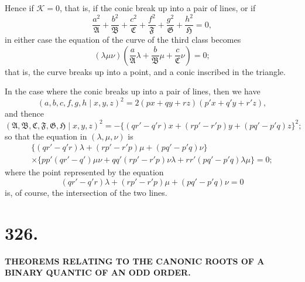 \documentclass[11pt,a4paper]{article}
\begin{document}
Hence if $\mathcal{K}=0$, that is, if the conic break up into a pair of lines, or if
\[
\frac{a^2}{\mathfrak{A}} + \frac{b^2}{\mathfrak{B}} + \frac{c^2}{\mathfrak{C}} + \frac{f^2}{\mathfrak{F}} + \frac{g^2}{\mathfrak{G}} + \frac{h^2}{\mathfrak{H}} = 0,
\]
in either case the equation of the curve of the third class becomes
\[
(\lambda\mu\nu)\left(\frac{a}{\mathfrak{A}}\lambda + \frac{b}{\mathfrak{B}}\mu + \frac{c}{\mathfrak{C}}\nu\right) = 0;
\]
that is, the curve breaks up into a point, and a conic inscribed in the triangle.

In the case where the conic breaks up into a pair of lines, then we have
\[
(a,b,c,f,g,h\mid x,y,z)^2 = 2(px+qy+rz)(p'x+q'y+r'z),
\]
and thence
\[
(\mathfrak{A},\mathfrak{B},\mathfrak{C},\mathfrak{F},\mathfrak{G},\mathfrak{H}\mid x,y,z)^2 = -\{(qr'-q'r)x + (rp'-r'p)y + (pq'-p'q)z\}^2;
\]
so that the equation in $(\lambda,\mu,\nu)$ is
\begin{multline*}
\{(qr'-q'r)\lambda + (rp'-r'p)\mu + (pq'-p'q)\nu\}\\
\times \{pp'(qr'-q')\mu\nu + qq'(rp'-r'p)\nu\lambda + rr'(pq'-p'q)\lambda\mu\} = 0;
\end{multline*}
where the point represented by the equation
\[
(qr'-q'r)\lambda + (rp'-r'p)\mu + (pq'-p'q)\nu = 0
\]
is, of course, the intersection of the two lines.

\newpage
\section*{326.}

\begin{center}
\textbf{THEOREMS RELATING TO THE CANONIC ROOTS OF A BINARY QUANTIC OF AN ODD ORDER.}
\end{center}


\bigskip
\end{document}
